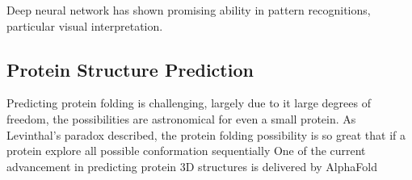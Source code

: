 Deep neural network has shown promising ability in pattern recognitions, particular visual interpretation.
\par 

\subsection{Protein Structure Prediction}
Predicting protein folding is challenging, largely due to it large degrees of freedom, the possibilities are astronomical for even a small protein. As Levinthal's paradox described, the protein folding possibility is so great that if a protein explore all possible conformation sequentially  One of the current advancement in predicting protein 3D structures is delivered by AlphaFold
